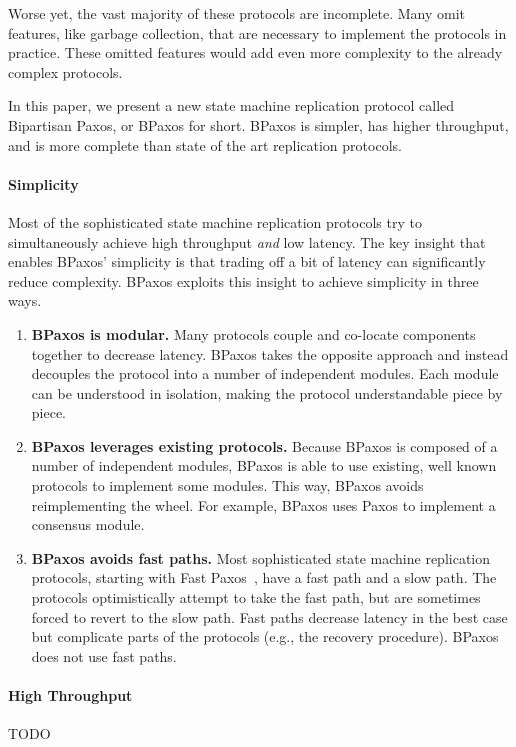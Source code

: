 Worse yet, the vast majority of these protocols are incomplete. Many omit
features, like garbage collection, that are necessary to implement the
protocols in practice. These omitted features would add even more complexity to
the already complex protocols.

In this paper, we present a new state machine replication protocol called
Bipartisan Paxos, or BPaxos for short. BPaxos is simpler, has higher
throughput, and is more complete than state of the art replication protocols.

\paragraph{Simplicity}
Most of the sophisticated state machine replication protocols try to
simultaneously achieve high throughput \emph{and} low latency. The key insight
that enables BPaxos' simplicity is that trading off a bit of latency can
significantly reduce complexity. BPaxos exploits this insight to achieve
simplicity in three ways.
\begin{enumerate}
  \item
    \textbf{BPaxos is modular.} Many protocols couple and co-locate components
    together to decrease latency. BPaxos takes the opposite approach and
    instead decouples the protocol into a number of independent modules. Each
    module can be understood in isolation, making the protocol understandable
    piece by piece.
  \item
    \textbf{BPaxos leverages existing protocols.} Because BPaxos is composed of
    a number of independent modules, BPaxos is able to use existing, well known
    protocols to implement some modules. This way, BPaxos avoids reimplementing
    the wheel. For example, BPaxos uses Paxos to implement a consensus module.
  \item
    \textbf{BPaxos avoids fast paths.} Most sophisticated state machine
    replication protocols, starting with Fast Paxos~\cite{lamport2006fast},
    have a fast path and a slow path. The protocols optimistically attempt to
    take the fast path, but are sometimes forced to revert to the slow path.
    Fast paths decrease latency in the best case but complicate parts of the
    protocols (e.g., the recovery procedure). BPaxos does not use fast paths.
\end{enumerate}

\paragraph{High Throughput}
TODO

